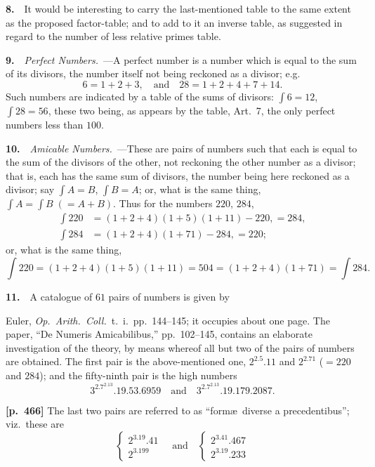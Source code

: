 \documentclass[11pt,a4paper]{article}
\providecommand{\sumdiv}{{\textstyle\int}}
\begin{document}
\textbf{8.}\ \ It would be interesting to carry the last-mentioned table to the same extent as the proposed factor-table; and to add to it an inverse table, as suggested in regard to the number of less relative primes table.

\textbf{9.}\ \ \textit{Perfect Numbers.}\ ---A perfect number is a number which is equal to the sum of its divisors, the number itself not being reckoned as a divisor; e.g.\
\[
6=1+2+3,\quad\text{and}\quad 28=1+2+4+7+14.
\]
Such numbers are indicated by a table of the sums of divisors: $\sumdiv 6=12$, $\sumdiv 28=56$, these two being, as appears by the table, Art.~7, the only perfect numbers less than $100$.

\textbf{10.}\ \ \textit{Amicable Numbers.}\ ---These are pairs of numbers such that each is equal to the sum of the divisors of the other, not reckoning the other number as a divisor; that is, each has the same sum of divisors, the number being here reckoned as a divisor; say $\sumdiv A=B$, $\sumdiv B=A$; or, what is the same thing, $\sumdiv A=\sumdiv B\;(=A+B)$.   Thus for the numbers $220,\,284$,
\[
\begin{aligned}
\sumdiv 220 &= (1+2+4)(1+5)(1+11)-220, = 284, \\
\sumdiv 284 &= (1+2+4)(1+71)-284, = 220;
\end{aligned}
\]
or, what is the same thing,
\[
\sumdiv 220 = (1+2+4)(1+5)(1+11) = 504 = (1+2+4)(1+71) = \sumdiv 284.
\]

\textbf{11.}\ \ A catalogue of $61$ pairs of numbers is given by

Euler, \textit{Op.\ Arith.\ Coll.}\ t.~i.\ pp.~144--145; it occupies about one page.   The paper, ``De Numeris Amicabilibus,'' pp.~102--145, contains an elaborate investigation of the theory, by means whereof all but two of the pairs of numbers are obtained.   The first pair is the above-mentioned one, $2^2.5.11$ and $2^2.71$ ($=220$ and $284$); and the fifty-ninth pair is the high numbers
\[
3^2.7^2.13.19.53.6959\quad\text{and}\quad 3^2.7^2.13.19.179.2087.
\]

\bigskip
\noindent\textbf{[p.~466]}\quad
The last two pairs are referred to as ``form\ae\ diverse a precedentibus''; viz.\ these are
\[
\left\{\begin{array}{c}2^3.19.41 \\ 2^3.199\end{array}\right.\quad\text{and}\quad\left\{\begin{array}{c}2^3.41.467 \\ 2^3.19.233\end{array}\right.
\]
\end{document}
